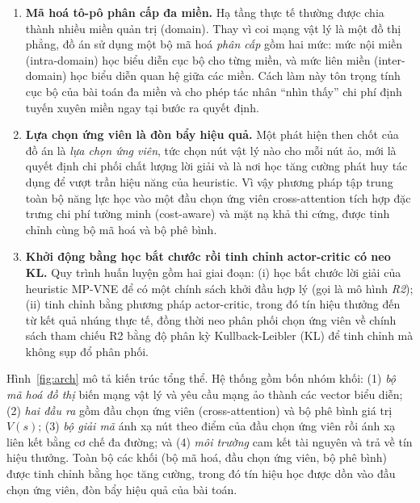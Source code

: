 \documentclass[../DoAn.tex]{subfiles}
\begin{document}
\begin{enumerate}
\item \textbf{Mã hoá tô-pô phân cấp đa miền.} Hạ tầng thực tế thường được chia thành nhiều miền quản trị (domain). Thay vì coi mạng vật lý là một đồ thị phẳng, đồ án sử dụng một bộ mã hoá \textit{phân cấp} gồm hai mức: mức nội miền (intra-domain) học biểu diễn cục bộ cho từng miền, và mức liên miền (inter-domain) học biểu diễn quan hệ giữa các miền. Cách làm này tôn trọng tính cục bộ của bài toán đa miền và cho phép tác nhân ``nhìn thấy'' chi phí định tuyến xuyên miền ngay tại bước ra quyết định.

\item \textbf{Lựa chọn ứng viên là đòn bẩy hiệu quả.} Một phát hiện then chốt của đồ án là \textit{lựa chọn ứng viên}, tức chọn nút vật lý nào cho mỗi nút ảo, mới là quyết định chi phối chất lượng lời giải và là nơi học tăng cường phát huy tác dụng để vượt trần hiệu năng của heuristic. Vì vậy phương pháp tập trung toàn bộ năng lực học vào một đầu chọn ứng viên cross-attention tích hợp đặc trưng chi phí tường minh (cost-aware) và mặt nạ khả thi cứng, được tinh chỉnh cùng bộ mã hoá và bộ phê bình.

\item \textbf{Khởi động bằng học bắt chước rồi tinh chỉnh actor-critic có neo KL.} Quy trình huấn luyện gồm hai giai đoạn: (i) học bắt chước lời giải của heuristic MP-VNE để có một chính sách khởi đầu hợp lý (gọi là mô hình \textit{R2}); (ii) tinh chỉnh bằng phương pháp actor-critic, trong đó tín hiệu thưởng đến từ kết quả nhúng thực tế, đồng thời neo phân phối chọn ứng viên về chính sách tham chiếu R2 bằng độ phân kỳ Kullback-Leibler (KL) để tinh chỉnh mà không sụp đổ phân phối.
\end{enumerate}

Hình~\ref{fig:arch} mô tả kiến trúc tổng thể. Hệ thống gồm bốn nhóm khối: (1) \textit{bộ mã hoá đồ thị} biến mạng vật lý và yêu cầu mạng ảo thành các vector biểu diễn; (2) \textit{hai đầu ra} gồm đầu chọn ứng viên (cross-attention) và bộ phê bình giá trị $V(s)$; (3) \textit{bộ giải mã} ánh xạ nút theo điểm của đầu chọn ứng viên rồi ánh xạ liên kết bằng cơ chế đa đường; và (4) \textit{môi trường} cam kết tài nguyên và trả về tín hiệu thưởng. Toàn bộ các khối (bộ mã hoá, đầu chọn ứng viên, bộ phê bình) được tinh chỉnh bằng học tăng cường, trong đó tín hiệu học được dồn vào đầu chọn ứng viên, đòn bẩy hiệu quả của bài toán.
\end{document}
